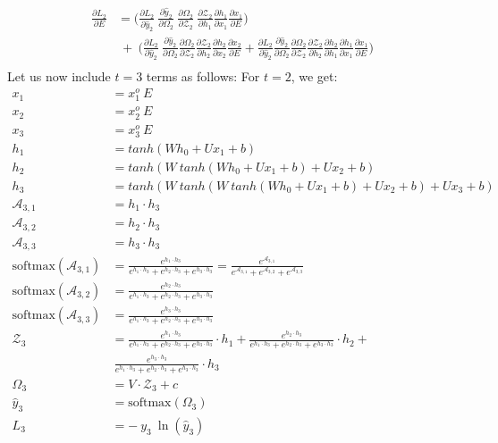 \documentclass{article}
\begin{document}
\begin{align*}
	\frac{\partial L_2}{ \partial{E}} & = \biggl(\frac{\partial L_2}{\partial \hat{y}_2}~\frac{\partial \hat{y}_2}{\partial \Omega_2}~\frac{\partial \Omega_2}{ \partial \mathcal{Z}_2} ~ \frac{\partial \mathcal{Z}_2}{ \partial h_1} \frac{\partial h_1}{ \partial x_1} \frac{\partial x_1}{ \partial E} \biggl) \\
	& ~+~
	\biggl(\frac{\partial L_2}{\partial \hat{y}_2}~\frac{\partial \hat{y}_2}{\partial \Omega_2}\frac{\partial \Omega_2}{ \partial \mathcal{Z}_2} \frac{\partial \mathcal{Z}_2}{ \partial h_2} \frac{\partial h_2}{ \partial x_2}\frac{\partial x_2}{ \partial E}+ \frac{\partial L_2}{\partial \hat{y}_2}\frac{\partial \hat{y}_2}{\partial \Omega_2}\frac{\partial \Omega_2}{ \partial \mathcal{Z}_2} \frac{\partial \mathcal{Z}_2}{ \partial h_2} \frac{\partial h_2}{ \partial h_1}\frac{\partial h_1}{ \partial x_1} \frac{\partial x_1}{ \partial E}\biggl)\\
\end{align*}
\newpage
Let us now include $t=3$ terms as follows:
For $t=2$, we get:
\begin{align*}
 x_1 &= x^o_1 ~ E \\
  x_2 &= x^o_2 ~ E \\
    x_3 &= x^o_3 ~ E \\
	h_1 &= tanh(W h_0 +Ux_1 +b)\\
	h_2 &= tanh(W~tanh(W h_0 +Ux_1 +b)+Ux_2 +b)\\
	h_3 &= tanh(W~tanh(W~tanh(W h_0 +Ux_1 +b)+Ux_2 +b)+ U x_3 + b)\\
	\mathcal{A}_{3,1} &= h_1 \cdot h_3\\
	\mathcal{A}_{3,2} &=h_2 \cdot h_3 \\
	\mathcal{A}_{3,3} &=h_3 \cdot h_3 \\
	\text{softmax}(\mathcal{A}_{3,1}) &= \frac{e^{h_1 \cdot h_3 }}
	{e^{h_1 \cdot h_3}+e^{h_2 \cdot h_3}+e^{h_3 \cdot h_3}} = \frac{e^{\mathcal{A}_{3,1}}}
	{e^{\mathcal{A}_{3,1}}+e^{\mathcal{A}_{3,2}}+e^{\mathcal{A}_{3,3}}}\\
	\text{softmax}(\mathcal{A}_{3,2}) &= \frac{e^{h_2 \cdot h_3 }}
	{e^{h_1 \cdot h_3}+e^{h_2 \cdot h_3}+e^{h_3 \cdot h_3}}\\
	\text{softmax}(\mathcal{A}_{3,3}) &= \frac{e^{h_3 \cdot h_3 }}
	{e^{h_1 \cdot h_3}+e^{h_2 \cdot h_3}+e^{h_3 \cdot h_3}}\\
	\mathcal{Z}_3 &= \frac{e^{h_1 \cdot h_3 }}
	{e^{h_1 \cdot h_3}+e^{h_2 \cdot h_3}+e^{h_3 \cdot h_3}}\cdot h_1+
	\frac{e^{h_2 \cdot h_3 }}
	{e^{h_1 \cdot h_3}+e^{h_2 \cdot h_3}+e^{h_3 \cdot h_3}}\cdot h_2+\\
	&~\frac{e^{h_3 \cdot h_3 }}
	{e^{h_1 \cdot h_3}+e^{h_2 \cdot h_3}+e^{h_3 \cdot h_3}}\cdot h_3
	\\
	\Omega_3 &= V \cdot \mathcal{Z}_3 + c\\
	\hat{y}_3 &= \text{softmax}(\Omega_3)\\
	L_3 &= -~y_3~\ln{(\hat{y}_3)}
\end{align*}
\end{document}
